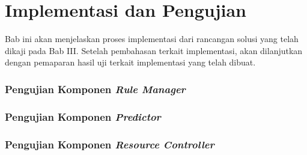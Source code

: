 \chapter{Implementasi dan Pengujian}
Bab ini akan menjelaskan proses implementasi dari rancangan solusi yang telah dikaji pada Bab III. Setelah pembahasan terkait implementasi, akan dilanjutkan dengan pemaparan hasil uji terkait implementasi yang telah dibuat.










\subsection{Pengujian Komponen \textit{Rule Manager}}
\subsection{Pengujian Komponen \textit{Predictor}}
\subsection{Pengujian Komponen \textit{Resource Controller}}
